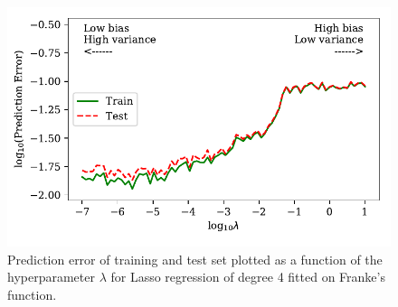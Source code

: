 \documentclass[a4paper, 10pt]{article}
\begin{document}
\begin{figure}
    \includegraphics{figs/biasvariancetradeoff_LASSO_Franke.pdf}
    \caption{Prediction error of training and test set plotted as a function of the hyperparameter $\lambda$ for Lasso regression of degree 4 fitted on Franke's function.}
    \label{fig:bias_lasso_Franke}
\end{figure}
\end{document}

